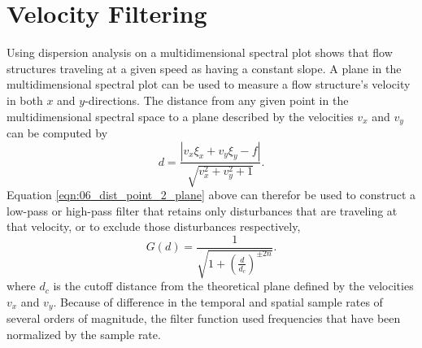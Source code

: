 \section{Velocity Filtering}
\label{chap:06_velocity_filter}
Using dispersion analysis on a multidimensional spectral plot shows that flow structures traveling at a given speed as having a constant slope.
A plane in the multidimensional spectral plot can be used to measure a flow structure's velocity in both $x$ and $y$-directions.
The distance from any given point in the multidimensional spectral space to a plane described by the velocities $v_x$ and $v_y$ can be computed by
\begin{equation}
 d = \frac{|v_x\xi_x+v_y\xi_y-f|}{\sqrt{v_x^2+v_y^2+1}} \textrm{.}
 \label{eqn:06_dist_point_2_plane}
\end{equation}
Equation \ref{eqn:06_dist_point_2_plane} above can therefor be used to construct a low-pass or high-pass filter that retains only disturbances that are traveling at that velocity, or to exclude those disturbances respectively,
\begin{equation}
  G(d) = \frac{1}{\sqrt{1+\left(\frac{d}{d_c}\right)^{\pm2n}}} \textrm{.}
  \label{eqn:06_butterworth_velocity}
\end{equation}
where $d_c$ is the cutoff distance from the theoretical plane defined by the velocities $v_x$ and $v_y$.
Because of difference in the temporal and spatial sample rates of several orders of magnitude, the filter function used frequencies that have been normalized by the sample rate.


